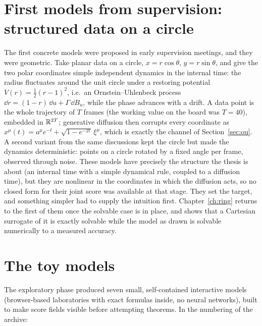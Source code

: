 \section{First models from supervision: structured data on a circle}
\label{sec:dev-board}

The first concrete models were proposed in early supervision meetings,
and they were geometric. Take planar data on a circle, $x = r\cos\theta$,
$y = r\sin\theta$, and give the two polar coordinates simple independent
dynamics in the internal time: the radius fluctuates around the unit
circle under a restoring potential $V(r) = \tfrac{1}{2}(r-1)^2$, i.e.\ an
Ornstein--Uhlenbeck process $\dd r = (1 - r)\,\dd u + \Gamma\,\dd B_u$,
while the phase advances with a drift. A data point is the whole
trajectory of $T$ frames (the working value on the board was $T = 40$),
embedded in $\mathbb{R}^{2T}$; generative diffusion then corrupts every
coordinate as $x^\mu(t) = a^\mu e^{-t} + \sqrt{1 - e^{-2t}}\,\xi^\mu$,
which is exactly the channel of Section~\ref{sec:ou}. A second variant
from the same discussions kept the circle but made the dynamics
deterministic: points on a circle rotated by a fixed angle per frame,
observed through noise. These models have precisely the structure the
thesis is about (an internal time with a simple dynamical rule, coupled
to a diffusion time), but they are nonlinear in the coordinates in which
the diffusion acts, so no closed form for their joint score was available
at that stage. They set the target, and something simpler had to supply the
intuition first. Chapter~\ref{ch:ring} returns to the first of them once the
solvable case is in place, and shows that a Cartesian surrogate of it is
exactly solvable while the model as drawn is solvable numerically to a
measured accuracy.

\section{The toy models}\label{sec:dev-toys}

The exploratory phase produced seven small, self-contained interactive
models (browser-based laboratories with exact formulas inside, no neural
networks), built to make score fields visible before attempting theorems.
In the numbering of the archive:

